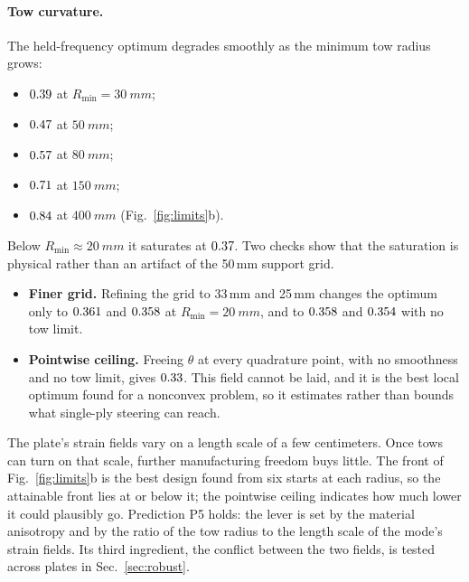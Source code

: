\paragraph{Tow curvature.} The held-frequency optimum degrades smoothly as the minimum
tow radius grows:
\begin{itemize}[itemsep=1pt]
\item $0.39$ at $R_{\min}=\SI{30}{mm}$;
\item $0.47$ at $\SI{50}{mm}$;
\item $0.57$ at $\SI{80}{mm}$;
\item $0.71$ at $\SI{150}{mm}$;
\item $0.84$ at $\SI{400}{mm}$ (Fig.~\ref{fig:limits}b).
\end{itemize}
Below $R_{\min}\approx\SI{20}{mm}$ it saturates at $0.37$. Two checks show that
the saturation is physical rather than an artifact of the 50\,mm support grid.
\begin{itemize}[itemsep=1pt]
\item \textbf{Finer grid.} Refining the grid to 33\,mm and 25\,mm changes the optimum
  only to $0.361$ and $0.358$ at $R_{\min}=\SI{20}{mm}$, and to
  $0.358$ and $0.354$ with no tow limit.
\item \textbf{Pointwise ceiling.} Freeing $\theta$ at every quadrature point, with no
  smoothness and no tow limit, gives $0.33$. This field cannot be laid, and it is the best
  local optimum found for a nonconvex problem, so it estimates rather than bounds what
  single-ply steering can reach.
\end{itemize}
The plate's strain fields vary on a length scale of a few centimeters. Once tows can
turn on that scale, further manufacturing freedom buys little. The front of
Fig.~\ref{fig:limits}b is the best design found from six starts at each radius, so the attainable
front lies at or below it; the pointwise ceiling indicates how much lower it could plausibly go. Prediction P5 holds:
the lever is set by the material anisotropy and by the ratio of the tow radius to the
length scale of the mode's strain fields. Its third ingredient, the conflict between the two
fields, is tested across plates in Sec.~\ref{sec:robust}.

